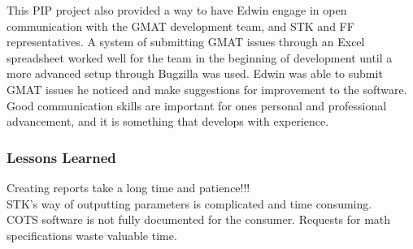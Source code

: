 This PIP project also provided a way to have Edwin engage in open
communication with the GMAT development team, and STK and FF
representatives. A system of submitting GMAT issues through an Excel
spreadsheet worked well for the team in the beginning of development
until a more advanced setup through Bugzilla was used. Edwin was
able to submit GMAT issues he noticed and make suggestions for
improvement to the software. Good communication skills are important
for ones personal and professional advancement, and it is something
that develops with experience.

\subsubsection{Lessons Learned}
Creating reports take a long time and patience!!!\\
STK's way of outputting parameters is complicated and time consuming.\\
COTS software is not fully documented for the consumer. Requests for math specifications waste valuable time.\\
